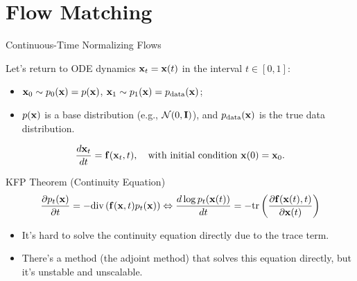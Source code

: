 \documentclass{beamer}
\renewcommand{\eqpause}{}
\begin{document}
\section{Flow Matching}
\begin{frame}{Continuous-Time Normalizing Flows}

	Let's return to ODE dynamics $\mathbf{x}_t = \mathbf{x}(t)$ in the interval $t \in [0, 1]$:
	\begin{itemize}
		\item $\mathbf{x}_0 \sim p_0(\mathbf{x}) = p(\mathbf{x})$, $\mathbf{x}_1 \sim p_1(\mathbf{x}) =  p_{\text{data}}(\mathbf{x})$;
		\item $p(\mathbf{x})$ is a base distribution (e.g., $\mathcal{N}(0, \mathbf{I})$), and $p_{\text{data}}(\mathbf{x})$ is the true data distribution.
	\end{itemize}
	\[
		\frac{d \mathbf{x}_t}{dt} = \mathbf{f} (\mathbf{x}_t, t),  \quad \text{with initial condition } \mathbf{x}(0) = \mathbf{x}_0.
	\]
    \eqpause
	\vspace{-0.3cm}
	\begin{block}{KFP Theorem (Continuity Equation)}
		\vspace{-0.5cm}
		\[
			\frac{\partial p_t(\mathbf{x})}{\partial t} = - \text{div}\left(\mathbf{f}(\mathbf{x}, t) p_t(\mathbf{x})\right) \Leftrightarrow \frac{d \log p_t(\mathbf{x}(t))}{d t} = - \text{tr} \left( \frac{\partial \mathbf{f}(\mathbf{x}(t), t)}{\partial \mathbf{x}(t)} \right)
		\]
		\vspace{-0.3cm}
	\end{block}
    \eqpause
	\begin{itemize}
		\item It's hard to solve the continuity equation directly due to the trace term.
		\item There's a method (the adjoint method) that solves this equation directly, but it's unstable and unscalable.
	\end{itemize}
\end{frame}
\end{document}
